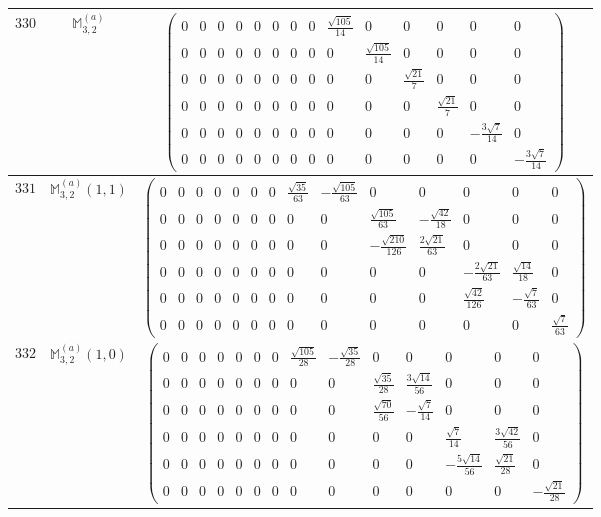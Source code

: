 \documentclass[fleqn,8pt,landscape]{jsarticle}
\begin{document}
\begin{center}
\begin{longtable}{ccc}
$ 330 $ & $ \mathbb{M}_{3,2}^{(a)} $ & $ \begin{pmatrix} 0 & 0 & 0 & 0 & 0 & 0 & 0 & 0 & \frac{\sqrt{105}}{14} & 0 & 0 & 0 & 0 & 0 \\ 0 & 0 & 0 & 0 & 0 & 0 & 0 & 0 & 0 & \frac{\sqrt{105}}{14} & 0 & 0 & 0 & 0 \\ 0 & 0 & 0 & 0 & 0 & 0 & 0 & 0 & 0 & 0 & \frac{\sqrt{21}}{7} & 0 & 0 & 0 \\ 0 & 0 & 0 & 0 & 0 & 0 & 0 & 0 & 0 & 0 & 0 & \frac{\sqrt{21}}{7} & 0 & 0 \\ 0 & 0 & 0 & 0 & 0 & 0 & 0 & 0 & 0 & 0 & 0 & 0 & - \frac{3 \sqrt{7}}{14} & 0 \\ 0 & 0 & 0 & 0 & 0 & 0 & 0 & 0 & 0 & 0 & 0 & 0 & 0 & - \frac{3 \sqrt{7}}{14} \end{pmatrix} $ \\ \hline
$ 331 $ & $ \mathbb{M}_{3,2}^{(a)}(1,1) $ & $ \begin{pmatrix} 0 & 0 & 0 & 0 & 0 & 0 & 0 & \frac{\sqrt{35}}{63} & - \frac{\sqrt{105}}{63} & 0 & 0 & 0 & 0 & 0 \\ 0 & 0 & 0 & 0 & 0 & 0 & 0 & 0 & 0 & \frac{\sqrt{105}}{63} & - \frac{\sqrt{42}}{18} & 0 & 0 & 0 \\ 0 & 0 & 0 & 0 & 0 & 0 & 0 & 0 & 0 & - \frac{\sqrt{210}}{126} & \frac{2 \sqrt{21}}{63} & 0 & 0 & 0 \\ 0 & 0 & 0 & 0 & 0 & 0 & 0 & 0 & 0 & 0 & 0 & - \frac{2 \sqrt{21}}{63} & \frac{\sqrt{14}}{18} & 0 \\ 0 & 0 & 0 & 0 & 0 & 0 & 0 & 0 & 0 & 0 & 0 & \frac{\sqrt{42}}{126} & - \frac{\sqrt{7}}{63} & 0 \\ 0 & 0 & 0 & 0 & 0 & 0 & 0 & 0 & 0 & 0 & 0 & 0 & 0 & \frac{\sqrt{7}}{63} \end{pmatrix} $ \\ \hline
$ 332 $ & $ \mathbb{M}_{3,2}^{(a)}(1,0) $ & $ \begin{pmatrix} 0 & 0 & 0 & 0 & 0 & 0 & 0 & \frac{\sqrt{105}}{28} & - \frac{\sqrt{35}}{28} & 0 & 0 & 0 & 0 & 0 \\ 0 & 0 & 0 & 0 & 0 & 0 & 0 & 0 & 0 & \frac{\sqrt{35}}{28} & \frac{3 \sqrt{14}}{56} & 0 & 0 & 0 \\ 0 & 0 & 0 & 0 & 0 & 0 & 0 & 0 & 0 & \frac{\sqrt{70}}{56} & - \frac{\sqrt{7}}{14} & 0 & 0 & 0 \\ 0 & 0 & 0 & 0 & 0 & 0 & 0 & 0 & 0 & 0 & 0 & \frac{\sqrt{7}}{14} & \frac{3 \sqrt{42}}{56} & 0 \\ 0 & 0 & 0 & 0 & 0 & 0 & 0 & 0 & 0 & 0 & 0 & - \frac{5 \sqrt{14}}{56} & \frac{\sqrt{21}}{28} & 0 \\ 0 & 0 & 0 & 0 & 0 & 0 & 0 & 0 & 0 & 0 & 0 & 0 & 0 & - \frac{\sqrt{21}}{28} \end{pmatrix} $ \\ \hline

\end{longtable}
\end{center}
\end{document}

